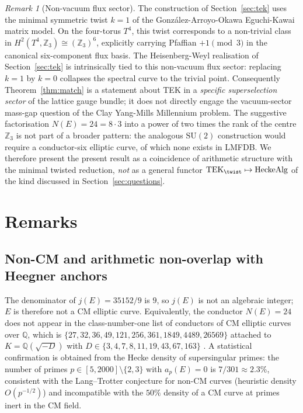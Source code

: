 \documentclass[11pt]{amsart}
\theoremstyle{definition}
\theoremstyle{remark}
\newtheorem{remark}[theorem]{Remark}
\newcommand{\Q}{\mathbb{Q}}
\newcommand{\SU}{\mathrm{SU}}
\newcommand{\TEK}{\mathrm{TEK}}
\begin{document}
\begin{remark}[Non-vacuum flux sector]\label{rem:flux}
The construction of Section~\ref{sec:tek} uses the minimal
symmetric twist \(k=1\) of the
Gonz\'{a}lez-Arroyo-Okawa Eguchi-Kawai matrix model.
On the four-torus \(T^4\), this twist corresponds to a non-trivial
class in \(H^2(T^4, \mathbb{Z}_3) \cong (\mathbb{Z}_3)^6\),
explicitly carrying Pfaffian \(+1 \pmod 3\) in the canonical
six-component flux basis. The Heisenberg-Weyl realisation of
Section~\ref{sec:tek} is intrinsically tied to this non-vacuum
flux sector: replacing \(k=1\) by \(k=0\) collapses the
spectral curve to the trivial point. Consequently
Theorem~\ref{thm:match} is a statement about TEK in a
\emph{specific superselection sector} of the lattice gauge bundle;
it does not directly engage the vacuum-sector mass-gap question
of the Clay Yang-Mills Millennium problem. The suggestive
factorisation \(N(E) = 24 = 8 \cdot 3\) into a power of two
times the rank of the centre $\mathbb{Z}_3$ is not part of a
broader pattern: the analogous \(\SU(2)\) construction would
require a conductor-six elliptic curve, of which none exists in
LMFDB. We therefore present the present result as a coincidence
of arithmetic structure with the minimal twisted reduction,
\emph{not} as a general functor \(\TEK_{\twist} \mapsto
\textnormal{HeckeAlg}\) of the kind discussed in
Section~\ref{sec:questions}.
\end{remark}

\section{Remarks}\label{sec:remarks}

\subsection{Non-CM and arithmetic non-overlap with Heegner anchors}

The denominator of \(j(E) = 35152/9\) is \(9\), so \(j(E)\) is not
an algebraic integer; \(E\) is therefore not a CM elliptic curve.
Equivalently, the conductor \(N(E) = 24\) does not appear in the
class-number-one list of conductors of CM elliptic curves over
\(\Q\), which is
\(\{27, 32, 36, 49, 121, 256, 361, 1849, 4489, 26569\}\) attached to
\(K = \Q(\sqrt{-D})\) with
\(D \in \{3, 4, 7, 8, 11, 19, 43, 67, 163\}\)
\cite[App.~A, Thm.~A.14]{Silverman2009}. A statistical confirmation
is obtained from the Hecke density of supersingular primes: the
number of primes \(p \in [5, 2000] \setminus \{2, 3\}\) with
\(a_{p}(E) = 0\) is \(7/301 \approx 2.3\%\), consistent with the
Lang--Trotter conjecture for non-CM curves (heuristic density
\(O(p^{-1/2})\)) and incompatible with the \(50\%\) density of a
CM curve at primes inert in the CM field.
\end{document}
